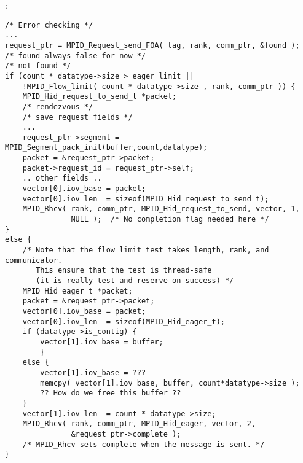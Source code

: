 :
\begin{verbatim}
/* Error checking */
...
request_ptr = MPID_Request_send_FOA( tag, rank, comm_ptr, &found );
/* found always false for now */
/* not found */
if (count * datatype->size > eager_limit ||
    !MPID_Flow_limit( count * datatype->size , rank, comm_ptr )) {
    MPID_Hid_request_to_send_t *packet;
    /* rendezvous */
    /* save request fields */
    ...
    request_ptr->segment = MPID_Segment_pack_init(buffer,count,datatype);
    packet = &request_ptr->packet;
    packet->request_id = request_ptr->self;
    .. other fields ..
    vector[0].iov_base = packet;
    vector[0].iov_len  = sizeof(MPID_Hid_request_to_send_t);
    MPID_Rhcv( rank, comm_ptr, MPID_Hid_request_to_send, vector, 1, 
               NULL );  /* No completion flag needed here */
}
else {
    /* Note that the flow limit test takes length, rank, and communicator.
       This ensure that the test is thread-safe 
       (it is really test and reserve on success) */
    MPID_Hid_eager_t *packet;
    packet = &request_ptr->packet; 
    vector[0].iov_base = packet;
    vector[0].iov_len  = sizeof(MPID_Hid_eager_t);
    if (datatype->is_contig) {
        vector[1].iov_base = buffer;
        }
    else {
        vector[1].iov_base = ???
        memcpy( vector[1].iov_base, buffer, count*datatype->size );
        ?? How do we free this buffer ??
    }
    vector[1].iov_len  = count * datatype->size;
    MPID_Rhcv( rank, comm_ptr, MPID_Hid_eager, vector, 2, 
               &request_ptr->complete );
    /* MPID_Rhcv sets complete when the message is sent. */
}
\end{verbatim}

